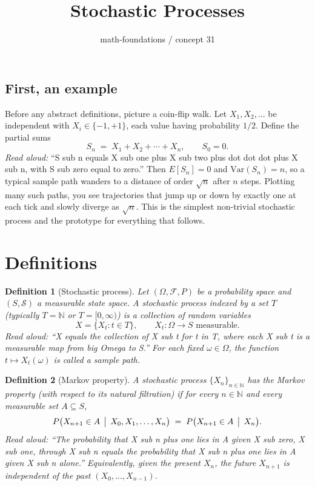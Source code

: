 \documentclass[11pt]{article}
\title{Stochastic Processes}
\author{math-foundations / concept 31}
\date{}
\newtheorem{definition}{Definition}
\begin{document}
\maketitle

\subsection*{First, an example}

Before any abstract definitions, picture a coin-flip walk. Let
$X_1, X_2, \dots$ be independent with $X_i \in \{-1, +1\}$, each value
having probability $1/2$. Define the partial sums
\[
  S_n \;=\; X_1 + X_2 + \cdots + X_n, \qquad S_0 = 0.
\]
\emph{Read aloud:} ``S sub n equals X sub one plus X sub two plus dot dot dot
plus X sub n, with S sub zero equal to zero.''
Then $E[S_n] = 0$ and $\mathrm{Var}(S_n) = n$, so a typical sample path
wanders to a distance of order $\sqrt{n}$ after $n$ steps. Plotting many
such paths, you see trajectories that jump up or down by exactly one at
each tick and slowly diverge as $\sqrt{n}$. This is the simplest
non-trivial stochastic process and the prototype for everything that
follows.

\section{Definitions}

\begin{definition}[Stochastic process]
Let $(\Omega, \mathcal{F}, P)$ be a probability space and $(S, \mathcal{S})$ a
measurable state space. A \emph{stochastic process} indexed by a set $T$
(typically $T = \mathbb{N}$ or $T = [0, \infty)$) is a collection of
random variables
\[
  X = \{ X_t : t \in T \}, \qquad X_t : \Omega \to S \text{ measurable.}
\]
\emph{Read aloud:} ``X equals the collection of X sub t for t in T, where
each X sub t is a measurable map from big Omega to S.''
For each fixed $\omega \in \Omega$, the function $t \mapsto X_t(\omega)$ is
called a \emph{sample path}.
\end{definition}

\begin{definition}[Markov property]
A stochastic process $\{X_n\}_{n \in \mathbb{N}}$ has the
\emph{Markov property} (with respect to its natural filtration) if for every
$n \in \mathbb{N}$ and every measurable set $A \subseteq S$,
\[
  P\bigl(X_{n+1} \in A \,\bigm|\, X_0, X_1, \dots, X_n\bigr)
  \;=\; P\bigl(X_{n+1} \in A \,\bigm|\, X_n\bigr).
\]
\emph{Read aloud:} ``The probability that X sub n plus one lies in A given
X sub zero, X sub one, through X sub n equals the probability that X sub
n plus one lies in A given X sub n alone.''
Equivalently, given the present $X_n$, the future $X_{n+1}$ is independent
of the past $(X_0, \dots, X_{n-1})$.
\end{definition}
\end{document}

